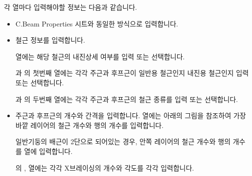 \documentclass[a4paper,11pt,korean,openany,oneside]{sphinxmanual}
\begin{document}
\sphinxAtStartPar
각 열마다 입력해야할 정보는 다음과 같습니다.
\begin{itemize}
\item {} \begin{description}
\sphinxAtStartPar
C.Beam Properties 시트와 동일한 방식으로 입력합니다.

\begin{figure}[htbp]
\centering

\noindent{}
\end{figure}

\end{description}

\item {} \begin{description}
\sphinxAtStartPar
철근 정보를 입력합니다.

\sphinxAtStartPar
{} 열에는 해당 철근의 내진상세 여부를 입력 또는 선택합니다.

\sphinxAtStartPar
{}과 의 첫번째 열에는 각각 주근과 후프근이 일반용 철근인지 내진용 철근인지 입력 또는 선택합니다.

\sphinxAtStartPar
{}과 의 두번째 열에는 각각 주근과 후프근의 철근 종류를 입력 또는 선택합니다.

\end{description}

\item {} \begin{description}
\sphinxAtStartPar
주근과 후프근의 개수와 간격을 입력합니다.
 열에는 아래의 그림을 참조하여 가장 바깥 레이어의 철근 개수와 행의 개수를 입력합니다.

\sphinxAtStartPar
일반기둥의 배근이 2단으로 되어있는 경우, 안쪽 레이어의 철근 개수와 행의 개수를  열에 입력합니다.

\begin{figure}[htbp]
\centering

\noindent{}
\end{figure}

\sphinxAtStartPar
{}의 ,  열에는 각각  X\sphinxhyphen{}브레이싱의 개수와 각도를 각각 입력합니다.

\begin{figure}[htbp]
\centering

\noindent{}
\end{figure}

\end{description}

\end{itemize}
\end{document}
